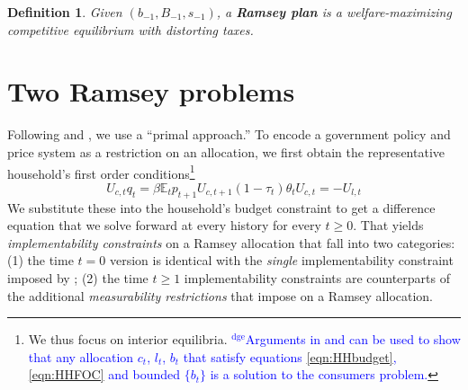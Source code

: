 \documentclass[12pt]{article}
\newcommand{\dge}[1]{\textcolor{blue}{$^{\textrm{dge}}${#1}}}
\newcommand{\EE}{\mathbb E}
\newtheorem{definition}[theorem]{Definition}
\begin{document}
\begin{definition}
Given $\left( b_{-1},B_{-1},s_{-1}\right) $, a \textbf{Ramsey plan} is a welfare-maximizing competitive
equilibrium with distorting taxes.
\end{definition}


\section{Two Ramsey problems}

Following \citet{LucasJr.1983}
and
\citet{Aiyagari2002}, we use a
``primal approach.''   To encode a  government policy and price system as a restriction on an allocation,
we  first obtain   the representative household's first order conditions\footnote{We thus focus on interior equilibria. \dge{Arguments in \cite{Magill1994} and \cite{Constantinides1996} can be used to show that any allocation $c_t$, $l_t$, $b_t$ that satisfy equations \eqref{eqn:HHbudget},\eqref{eqn:HHFOC} and bounded $\{b_t\}$ is a solution to the consumers problem.} }
\begin{subequations}\label{eqn:HHFOC}
	\begin{equation}
	\label{eqn:Euler}
		U_{c,t} q_t = \beta \EE_t p_{t+1}U_{c,t+1} 
	\end{equation}
	\begin{equation}\label{eqn:lcFOC}
		(1-\tau_t)\theta_tU_{c,t} = - U_{l,t} 
	\end{equation}


\end{subequations}
We substitute these into the household's budget constraint to get a difference equation that we  solve forward   at every history for every $t \geq 0$.
That yields \textit{implementability constraints} on a Ramsey allocation that fall into two categories: (1) the time $t=0$ version is identical
with the {\em single} implementability constraint imposed by \citet{LucasJr.1983}; (2) the time $t \geq 1$ implementability constraints
are counterparts  of the additional
 \emph{measurability restrictions} that \citet{Aiyagari2002} impose on  a Ramsey allocation.
%
\end{document}

